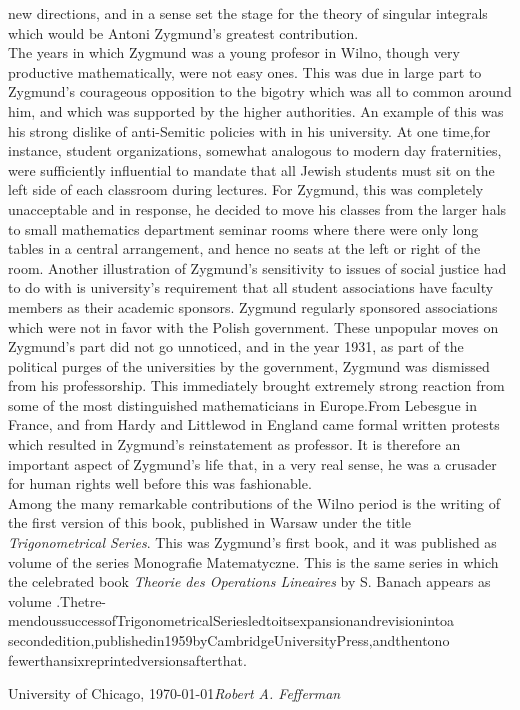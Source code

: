 new directions, and in a sense set the stage for the theory of singular integrals which would be Antoni Zygmund's 
greatest contribution.\\
\indent The years in which Zygmund was a young profesor in Wilno, though very productive mathematically, 
were not easy ones. This was due in large part to Zygmund's courageous opposition to the bigotry which was 
all to common around him, and which was supported by the higher authorities. An example of this was his 
strong dislike of anti-Semitic policies with in his university. At one time,for instance, student organizations, 
somewhat analogous to modern day fraternities, were sufficiently influential to mandate that all Jewish 
students must sit on the left side of each classroom during lectures. For Zygmund, this was completely unacceptable 
and in response, he decided to move his classes from the larger hals to small mathematics department seminar rooms 
where there were only long tables in a central arrangement, and hence no seats at the left or right of the 
room. Another illustration of Zygmund's sensitivity to issues of social justice had to do with is university's 
requirement that all student associations have faculty members as their academic sponsors. Zygmund 
regularly sponsored associations which were not in favor with the Polish government. These unpopular moves on 
Zygmund's part did not go unnoticed, and in the year 1931, as part of the political purges of the universities by 
the government, Zygmund was dismissed from his professorship. This immediately brought extremely strong reaction 
from some of the most distinguished mathematicians in Europe.From Lebesgue in France, and  from Hardy and 
Littlewod in England came formal written protests which resulted in Zygmund's reinstatement as professor. 
It is therefore an important aspect of Zygmund's life that, in a very real sense, he was a crusader for human 
rights well before this was fashionable.\\
\indent Among the many remarkable contributions of the Wilno period is the writing of the first version of 
this book, published in Warsaw under the title \textit{Trigonometrical Series}. This was Zygmund's first book, 
and it was published as volume  of the series Monografie Matematyczne. This is the same series in which the 
celebrated book \textit{Theorie des Operations Lineaires} by S. Banach appears as volume .Thetre-
mendoussuccessofTrigonometricalSeriesledtoitsexpansionandrevisionintoa
secondedition,publishedin1959byCambridgeUniversityPress,andthentono
fewerthansixreprintedversionsafterthat.






\vspace{\baselineskip}
\begin{flushright}\noindent
University of Chicago, \today \hfill {\it Robert A. Fefferman}\\
\end{flushright}


